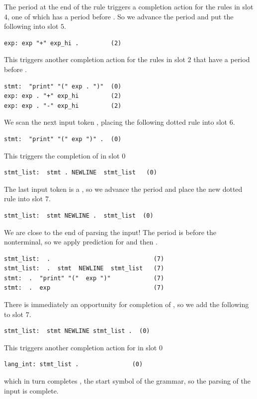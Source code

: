 \documentclass[7x10]{TimesAPriori_MIT}%
\numberwithin{theorem}{chapter}
\numberwithin{definition}{chapter}
\numberwithin{equation}{chapter}
\begin{document}
{The period at the end of the rule triggers a completion action for the
rules in slot $4$, one of which has a period before .
So we advance the period and put the following into slot $5$.
\begin{lstlisting}[escapechar=$]
exp: exp "+" exp_hi .         (2)
\end{lstlisting}
This triggers another completion action for the rules in slot $2$ that
have a period before .
\begin{lstlisting}[escapechar=$]
stmt:  "print" "(" exp . ")"  (0)
exp: exp . "+" exp_hi         (2)
exp: exp . "-" exp_hi         (2)
\end{lstlisting}

We scan the next input token , placing the following dotted
rule into slot $6$.
\begin{lstlisting}[escapechar=$]
stmt:  "print" "(" exp ")" .  (0)
\end{lstlisting}
This triggers the completion of  in slot $0$
\begin{lstlisting}
stmt_list:  stmt . NEWLINE  stmt_list   (0)
\end{lstlisting}
The last input token is a , so we advance the period
and place the new dotted rule into slot $7$.
\begin{lstlisting}
stmt_list:  stmt NEWLINE .  stmt_list  (0)
\end{lstlisting}
We are close to the end of parsing the input!
The period is before the  nonterminal, so we
apply prediction for  and then .
\begin{lstlisting}
stmt_list:  .                             (7)
stmt_list:  .  stmt  NEWLINE  stmt_list   (7)
stmt:  .  "print" "("  exp ")"            (7)
stmt:  .  exp                             (7)
\end{lstlisting}
There is immediately an opportunity for completion of ,
so we add the following to slot $7$.
\begin{lstlisting}
stmt_list:  stmt NEWLINE stmt_list .  (0)
\end{lstlisting}
This triggers another completion action for  in slot $0$
\begin{lstlisting}
lang_int: stmt_list .               (0)
\end{lstlisting}
which in turn completes , the start symbol of the
grammar, so the parsing of the input is complete.

}
\end{document}
